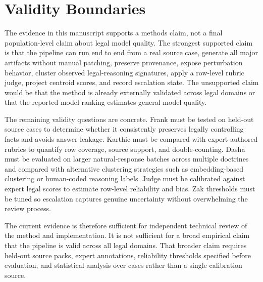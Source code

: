 \section{Validity Boundaries}

The evidence in this manuscript supports a methods claim, not a final
population-level claim about legal model quality. The strongest supported claim
is that the pipeline can run end to end from a real source case, generate all
major artifacts without manual patching, preserve provenance, expose
perturbation behavior, cluster observed legal-reasoning signatures, apply a
row-level rubric judge, project centroid scores, and record escalation state.
The unsupported claim would be that the method is already externally validated
across legal domains or that the reported model ranking estimates general model
quality.

\begin{table}[h]
\centering
\caption{Evidence boundaries for the reported validation gates.}
\label{tab:review-readiness}

\end{table}

The remaining validity questions are concrete. Frank must be tested on held-out
source cases to determine whether it consistently preserves legally controlling
facts and avoids answer leakage. Karthic must be compared with expert-authored
rubrics to quantify row coverage, source support, and double-counting. Dasha
must be evaluated on larger natural-response batches across multiple doctrines
and compared with alternative clustering strategies such as embedding-based
clustering or human-coded reasoning labels. Judge must be calibrated against
expert legal scores to estimate row-level reliability and bias. Zak thresholds
must be tuned so escalation captures genuine uncertainty without overwhelming
the review process.

The current evidence is therefore sufficient for independent technical review
of the method and implementation. It is not sufficient for a broad empirical
claim that the pipeline is valid across all legal domains. That broader claim
requires held-out source packs, expert annotations, reliability thresholds
specified before evaluation, and statistical analysis over cases rather than a
single calibration source.
